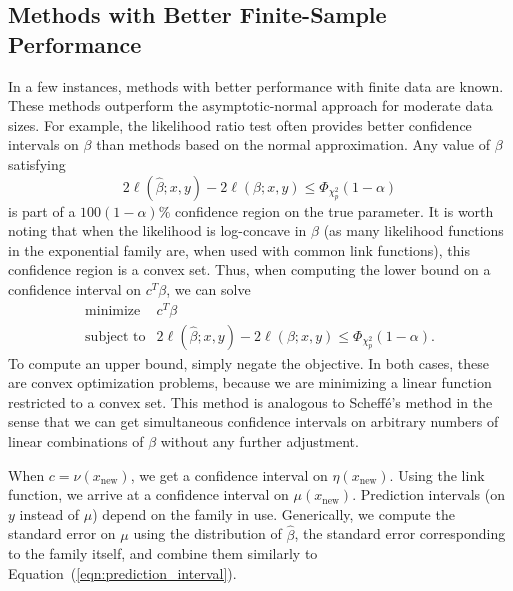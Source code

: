 \documentclass[12pt]{article}
\begin{document}
\subsection{Methods with Better Finite-Sample Performance}
In a few instances, methods with better performance with finite data are known. These methods outperform the asymptotic-normal approach for moderate data sizes.  For example, the likelihood ratio test often provides better confidence intervals on $\beta$ than methods based on the normal approximation. Any value of $\beta$ satisfying 
\begin{displaymath}
   2 \ell(\hat{\beta}; x, y) - 2 \ell(\beta; x, y) \leq \Phi_{\chi_p^2}(1 - \alpha)
\end{displaymath}
is part of a $100(1-\alpha)\%$ confidence region on the true parameter. It is worth noting that when the likelihood is log-concave in $\beta$ (as many likelihood functions in the exponential family are, when used with common link functions), this confidence region is a convex set. Thus, when computing the lower bound on a confidence interval on $c^T \beta$, we can solve
\begin{displaymath}
        \begin{array}{ll}
            \mbox{minimize} & c^T \beta \\
            \mbox{subject to} & 2 \ell(\hat{\beta}; x, y) - 2 \ell(\beta; x, y) \leq \Phi_{\chi_p^2}(1 - \alpha).
        \end{array}
\end{displaymath}
To compute an upper bound, simply negate the objective. In both cases, these are convex optimization problems, because we are minimizing a linear function restricted to a convex set. This method is analogous to Scheff\'e's method in the sense that we can get simultaneous confidence intervals on arbitrary numbers of linear combinations of $\beta$ without any further adjustment.

When $c = \nu(x_\textrm{new})$, we get a confidence interval on $\eta(x_\textrm{new})$. Using the link function, we arrive at a confidence interval on $\mu(x_\textrm{new})$. Prediction intervals (on $y$ instead of $\mu$) depend on the family in use. Generically, we compute the standard error on $\mu$ using the distribution of $\hat{\beta}$, the standard error corresponding to the family itself, and combine them similarly to Equation~(\ref{eqn:prediction_interval}).
\end{document}

